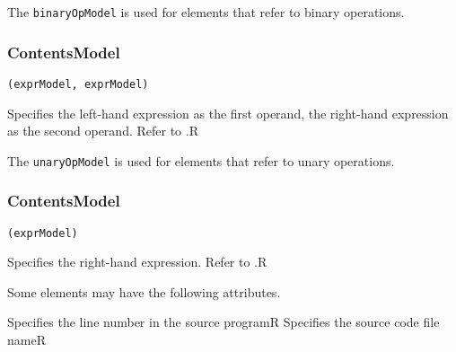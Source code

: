 The {\tt binaryOpModel} is used for elements that refer to binary operations.


\subsubsection*{ContentsModel}{}

\begin{lstlisting}[style=default,frame=none]
(exprModel, exprModel)
\end{lstlisting}

\begin{HIRChildElements}
	{Specifies the left-hand expression as the first operand, the right-hand 
	 expression as the second operand. Refer to .}{R}
\end{HIRChildElements}

The {\tt unaryOpModel} is used for elements that refer to unary operations.


\subsubsection*{ContentsModel}{}

\begin{lstlisting}[style=default,frame=none]
(exprModel)
\end{lstlisting}

\begin{HIRChildElements}
	{Specifies the right-hand expression. Refer to .}{R}
\end{HIRChildElements}


Some elements may have the following attributes. 
\begin{HIRAttributes}
    {Specifies the line number in the source program}{R}
    {Specifies the source code file name}{R}
\end{HIRAttributes}

